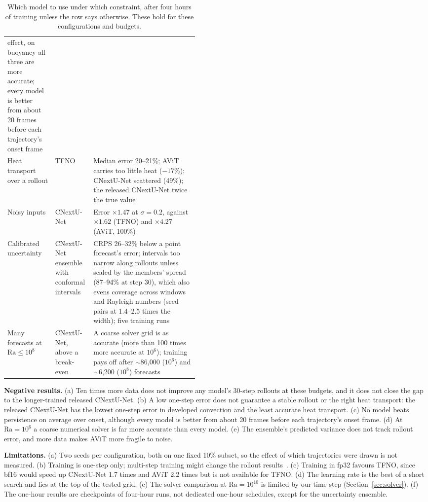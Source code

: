 \documentclass[11pt]{article}
\begin{document}
\begin{table}[!htbp]
\begin{tabularx}{\linewidth}{@{}>{\raggedright\arraybackslash}p{0.25\linewidth}>{\raggedright\arraybackslash}p{0.2\linewidth}>{\raggedright\arraybackslash}X@{}}
effect, on buoyancy all three are more accurate; every model is better from about 20 frames before each
trajectory's onset frame \\ \addlinespace[3pt]
Heat transport over a rollout & TFNO & Median error 20--21\%; AViT carries too little heat ($-17$\%); CNextU-Net
scattered (49\%); the released CNextU-Net twice the true value \\ \addlinespace[3pt]
Noisy inputs & CNextU-Net & Error $\times1.47$ at $\sigma=0.2$, against $\times1.62$ (TFNO) and $\times4.27$ (AViT,
100\%) \\ \addlinespace[3pt]
Calibrated uncertainty & CNextU-Net ensemble with conformal intervals & CRPS 26--32\% below a point forecast's error;
intervals too narrow along rollouts unless scaled by the members' spread (87--94\% at step 30), which also evens
coverage across windows and Rayleigh numbers (seed pairs at 1.4--2.5 times the width); five training runs \\
\addlinespace[3pt]
Many forecasts at $\mathrm{Ra}\le10^8$ & CNextU-Net, above a break-even & A coarse solver grid is as accurate
(more than 100 times more accurate at $10^6$); training pays off after $\sim$86,000 ($10^6$) and $\sim$6,200 ($10^8$)
forecasts \\
\bottomrule
\end{tabularx}
\caption{Which model to use under which constraint, after four hours of training unless the row says otherwise. These
hold for these configurations and budgets.}
\label{tab:choice}
\end{table}

\textbf{Negative results.} (a) Ten times more data does not improve any model's 30-step rollouts at these budgets,
and it does not close the gap to the longer-trained released CNextU-Net. (b) A low one-step error does not guarantee
a stable rollout or the right heat transport: the released CNextU-Net has the lowest one-step error in developed
convection and the least accurate heat transport. (c) No model beats persistence on average over onset, although every model is better from about 20
frames before each trajectory's onset frame. (d) At
$\mathrm{Ra}=10^6$ a coarse numerical solver is far more accurate than every model. (e) The ensemble's predicted
variance does not track rollout error, and more data makes AViT more fragile to noise.

\textbf{Limitations.} (a) Two seeds per configuration, both on one fixed 10\% subset, so the effect of which
trajectories were drawn is not measured. (b) Training is one-step only; multi-step training might change the rollout
results~\cite{brandstetter2022mp}. (c) Training in fp32 favours TFNO, since bf16 would speed up CNextU-Net 1.7 times
and AViT 2.2 times but is not available for TFNO. (d) The learning rate is the best of a short search and lies at the
top of the tested grid. (e) The solver comparison at $\mathrm{Ra}=10^{10}$ is limited by our time step
(Section~\ref{sec:solver}). (f) The one-hour results are checkpoints of four-hour runs, not dedicated one-hour
schedules, except for the uncertainty ensemble.
\end{document}
